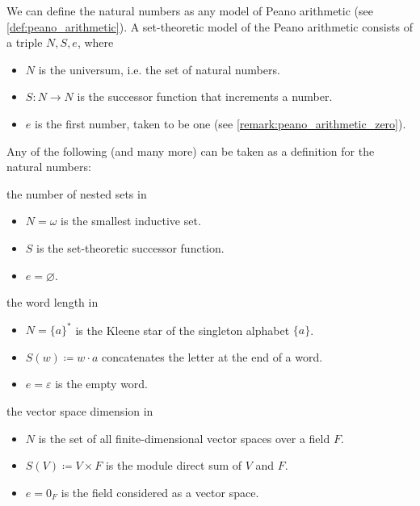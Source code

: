 \begin{definition}\label{def:natural_numbers}
  We can define the natural numbers as any model of Peano arithmetic (see \cref{def:peano_arithmetic}). A set-theoretic model of the Peano arithmetic consists of a triple \( N, S, e \), where
  \begin{itemize}
    \item \( N \) is the universum, i.e. the set of natural numbers.
    \item \( S: N \to N \) is the successor function that increments a number.
    \item \( e \) is the first number, taken to be one (see \cref{remark:peano_arithmetic_zero}).
  \end{itemize}

  Any of the following (and many more) can be taken as a definition for the natural numbers:
  \begin{defenum}
     the number of nested sets in
    \begin{itemize}
      \item \( N = \omega \) is the smallest inductive set.
      \item \( S \) is the set-theoretic successor function.
      \item \( e = \varnothing \).
    \end{itemize}

     the word length in
    \begin{itemize}
      \item \( N = \{ a \}^{*} \) is the Kleene star of the singleton alphabet \( \{ a \} \).
      \item \( S(w) \coloneqq w \cdot a \) concatenates the letter at the end of a word.
      \item \( e = \varepsilon \) is the empty word.
    \end{itemize}

     the vector space dimension in
    \begin{itemize}
      \item \( N \) is the set of all finite-dimensional vector spaces over a field \( F \).
      \item \( S(V) \coloneqq V \times F \) is the module direct sum of \( V \) and \( F \).
      \item \( e = 0_F \) is the field considered as a vector space.
    \end{itemize}
  \end{defenum}
\end{definition}

